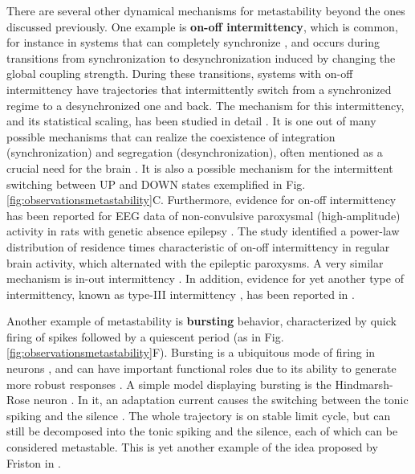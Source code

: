 \documentclass[reprint,superscriptaddress,showpacs,amsmath,amssymb,aps,floatfix,nolongbibliography]{revtex4-2}
\theoremstyle{definition}
\newcommand{\Emph}[1]{\textbf{#1}}
\begin{document}
There are several other dynamical mechanisms for metastability beyond the ones discussed previously. One example is \Emph{on-off intermittency}, which is common, for instance in systems that can completely synchronize \cite{ashwin1994bubbling, ott1994blowout, saha2017extreme}, and occurs during transitions from synchronization to desynchronization induced by changing the global coupling strength. During these transitions, systems with on-off intermittency have trajectories that intermittently switch from a synchronized regime to a desynchronized one and back. The mechanism for this intermittency, and its statistical scaling, has been studied in detail \cite{ platt1993onoff, heagy1994characterization, hammer1994experimental, cenis1997symmetry}. It is one out of many possible mechanisms that can realize the coexistence of integration (synchronization) and segregation (desynchronization), often mentioned as a crucial need for the brain \cite{fingelkurts2001operational, tognoli2014metastable, tognoli2014enlarging, deco2015rethinking}. It is also a possible mechanism for the intermittent switching between UP and DOWN states exemplified in Fig. \ref{fig:observationsmetastability}C. Furthermore, evidence for on-off intermittency has been reported for EEG data of non-convulsive paroxysmal (high-amplitude) activity in rats with genetic absence epilepsy \cite{hramov2006onoff}. The study identified a power-law distribution of residence times characteristic of on-off intermittency in regular brain activity, which alternated with the epileptic paroxysms.
A very similar mechanism is in-out intermittency \cite{ashwin1999transverse, ashwin2001influence,saha2018characteristics}. In addition, evidence for yet another type of intermittency, known as type-III intermittency \cite{pomeau1979intermittency}, has been reported in \cite{velazquez1999type}.

Another example of metastability is \Emph{bursting} behavior, characterized by quick firing of spikes followed by a quiescent period (as in Fig. \ref{fig:observationsmetastability}F). Bursting is a ubiquitous mode of firing in neurons \cite{fox2015bursting}, and can have important functional roles due to its ability to generate more robust responses \cite{swadlow2001impact}. A simple model displaying bursting is the Hindmarsh-Rose neuron \cite{hindmarshmodel1984}. In it, an adaptation current causes the switching between the tonic spiking and the silence \cite{hindmarshmodel1984}. The whole trajectory is on stable limit cycle, but can still be decomposed into the tonic spiking and the silence, each of which can be considered metastable. This is yet another example of the idea proposed by Friston in \cite{friston2000transients}. 
\end{document}
